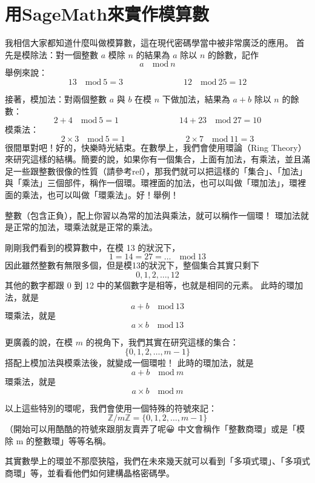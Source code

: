 \documentclass[
]{article}
\author{}
\date{}
\begin{document}
\hypertarget{ux7528sagemathux4f86ux5be6ux4f5cux6a21ux7b97ux6578}{%
\section{用SageMath來實作模算數}\label{ux7528sagemathux4f86ux5be6ux4f5cux6a21ux7b97ux6578}}

我相信大家都知道什麼叫做模算數，這在現代密碼學當中被非常廣泛的應用。
首先是模除法：對一個整數 \(a\) 模除 \(n\) 的結果為 \(a\) 除以 \(n\)
的餘數，記作 \[
a\quad\mathrm{mod} \ n 
\] 舉例來說： \[
13\quad \mathrm{mod} \ 5=3
\hspace{3cm}
12\quad \mathrm{mod} \ 25=12 
\]

接著，模加法：對兩個整數 \(a\) 與 \(b\) 在模 \(n\) 下做加法，結果為
\(a+b\) 除以 \(n\) 的餘數： \[
2 +4\quad \mathrm{mod} \  5 = 1
\hspace{3cm}
14+23\quad \mathrm{mod} \ 27=10 
\] 模乘法： \[
2\times3 \quad \mathrm{mod} \  5=1
\hspace{3cm}
2\times {7}\quad \mathrm{mod} \ 11=3 
\] 很間單對吧！好的，快樂時光結束。在數學上，我們會使用環論（Ring
Theory）來研究這樣的結構。簡要的說，如果你有一個集合，上面有加法，有乘法，並且滿足一些跟整數很像的性質（請參考ref），那我們就可以把這樣的「集合」、「加法」與「乘法」三個部件，稱作一個環。環裡面的加法，也可以叫做「環加法」，環裡面的乘法，也可以叫做「環乘法」。好！舉例！

整數（包含正負），配上你習以為常的加法與乘法，就可以稱作一個環！
環加法就是正常的加法，環乘法就是正常的乘法。

剛剛我們看到的模算數中，在模 13 的狀況下， \[
1 = 14=27=\dots\quad \mathrm{mod} \ 13 
\] 因此雖然整數有無限多個，但是模13的狀況下，整個集合其實只剩下 \[
0,1,2,\dots,12
\] 其他的數字都跟 0 到 12 中的某個數字是相等，也就是相同的元素。
此時的環加法，就是 \[
a + b \quad \mathrm{mod} \ 13 
\] 環乘法，就是 \[
a\times b \quad \mathrm{mod} \  13 
\]

更廣義的說，在模 \(m\) 的視角下，我們其實在研究這樣的集合： \[
\{0,1,2,\dots,m-1\}
\] 搭配上模加法與模乘法後，就變成一個環啦！ 此時的環加法，就是 \[
a + b \quad \mathrm{mod} \ m
\] 環乘法，就是 \[
a\times b \quad \mathrm{mod} \  m 
\]

以上這些特別的環呢，我們會使用一個特殊的符號來記： \[
\mathbb{Z}/m\mathbb{Z} = \{0,1,2,\dots,m-1\}
\] （開始可以用酷酷的符號來跟朋友賣弄了呢😀
中文會稱作「整數商環」或是「模除 m 的整數環」等等名稱。

其實數學上的環並不那麼狹隘，我們在未來幾天就可以看到「多項式環」、「多項式商環」等，並看看他們如何建構晶格密碼學。
\end{document}
